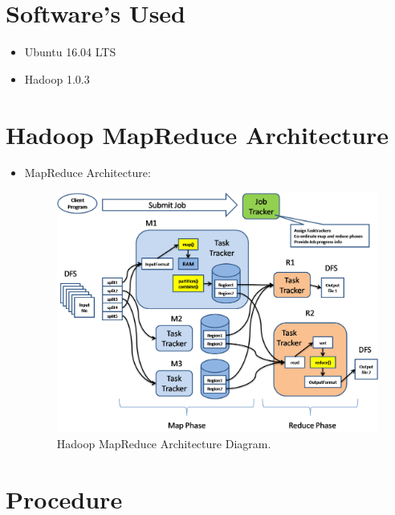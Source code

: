 \documentclass[a4paper,10pt]{article}
\begin{document}
\section{Software's Used}
\begin{itemize}
  \item Ubuntu  16.04 LTS
  \item Hadoop 1.0.3
\end{itemize}
\pagebreak

\section{Hadoop MapReduce Architecture}
\begin{itemize}
	\item MapReduce Architecture:
	\begin{figure}[h]
		\includegraphics[scale=0.45,center]{exptTwoScreenShot/MapRedArch.png}
		\caption{Hadoop MapReduce Architecture Diagram.}
		\label{fig:0}
	\end{figure}
\end{itemize}

\section{Procedure}
\end{document}
